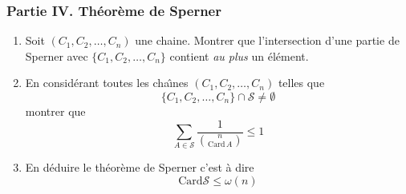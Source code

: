 \subsubsection*{Partie IV. Th{\'e}or{\`e}me de Sperner}
\begin{enumerate}
\item Soit $(C_1,C_2,\ldots,C_n)$ une chaine. Montrer que l'intersection d'une partie de Sperner avec $\{C_1,C_2,\ldots,C_n\}$ contient \emph{au plus} un élément.
\item En consid{\'e}rant toutes les cha{\^\i}nes $(C_1,C_2,\ldots,C_n)$ telles que 
\begin{displaymath}
\{C_1,C_2,\ldots,C_n\} \cap \mathcal{S} \neq \emptyset
\end{displaymath}
montrer que
\begin{displaymath}
\sum_{A \in \mathcal{S}}\dfrac{1}{ \binom{n}{\mathrm{Card} \,A}} \leq 1 
\end{displaymath}
\item
En d{\'e}duire le th{\'e}or{\`e}me de Sperner c'est {\`a} dire
\begin{displaymath}
\mathrm{Card} \mathcal{S} \leq \omega(n) 
\end{displaymath}
\end{enumerate}
